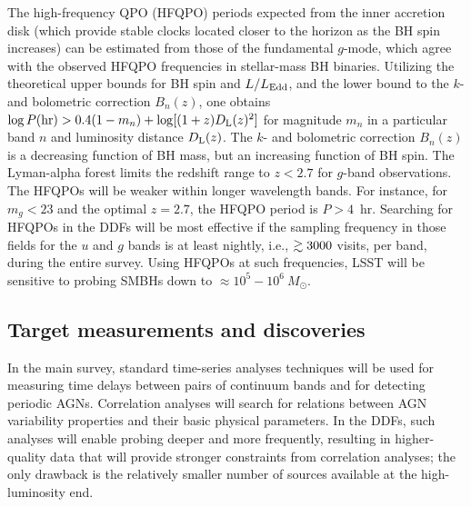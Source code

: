 The high-frequency QPO (HFQPO) periods expected from the inner accretion disk
(which provide stable clocks located closer to the horizon as the BH spin increases)
can be estimated from those of the fundamental $g$-mode, which agree with
the observed HFQPO frequencies in stellar-mass BH binaries. Utilizing the
theoretical upper bounds for BH spin and $L/L_{\rm Edd}$, and the lower
bound to the $k$- and bolometric correction $B_n(z)$, one obtains
$\log P({\rm hr}) > 0.4(1-m_n) + \log[(1+z)D_{\rm L}(z)^2]$ for magnitude
$m_n$ in a particular band $n$ and luminosity distance $D_{\rm L}(z)$.
The $k$- and bolometric correction $B_n(z)$ is a decreasing function of BH mass,
but an increasing function of BH spin. The Lyman-alpha forest limits the redshift
range to $z < 2.7$ for $g$-band observations. The HFQPOs will be weaker within longer
wavelength bands.
For instance, for $m_g  <  23$ and the optimal $z =  2.7$, the HFQPO period is $P > 4$~hr.
%
Searching for HFQPOs in the DDFs will be most effective if the sampling frequency
in those fields for the $u$ and $g$ bands is at least nightly, i.e., $\gtrsim3000$
visits, per band, during the entire survey. Using HFQPOs at such frequencies, LSST will be
sensitive to probing SMBHs down to $\approx10^{5} - 10^{6}~M_{\odot}$.



\subsection{Target measurements and discoveries}
\label{sec:\secname:targets}


In the main survey, standard time-series analyses techniques will be used
for measuring time delays between pairs of continuum bands and for detecting
periodic AGNs. Correlation analyses will search for relations between AGN
variability properties and their basic physical parameters. In the DDFs,
such analyses will enable probing deeper and more frequently, resulting in
higher-quality data that will provide stronger constraints from correlation
analyses; the only drawback is the relatively smaller number of sources
available at the high-luminosity end.


